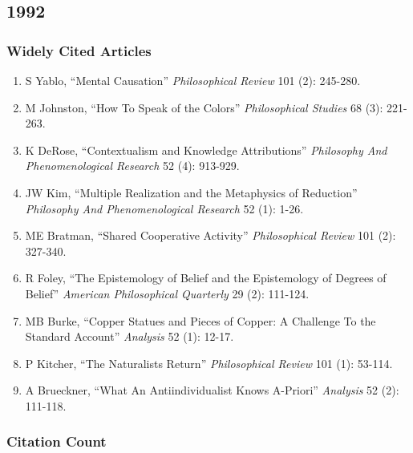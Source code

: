 \documentclass[
  10pt,
  letterpaper,
  DIV=11,
  numbers=noendperiod,
  twoside]{scrartcl}
\providecommand{\tightlist}{%
  \setlength{\itemsep}{0pt}\setlength{\parskip}{0pt}}\usepackage{longtable,booktabs,array}
\begin{document}
\newpage

\subsection{1992}\label{section-16}

\subsubsection*{Widely Cited Articles}\label{widely-cited-articles-16}

\begin{enumerate}
\def\labelenumi{\arabic{enumi}.}
\tightlist
\item
  S Yablo, ``Mental Causation'' \emph{Philosophical Review} 101 (2):
  245-280.
\item
  M Johnston, ``How To Speak of the Colors'' \emph{Philosophical
  Studies} 68 (3): 221-263.
\item
  K DeRose, ``Contextualism and Knowledge Attributions''
  \emph{Philosophy And Phenomenological Research} 52 (4): 913-929.
\item
  JW Kim, ``Multiple Realization and the Metaphysics of Reduction''
  \emph{Philosophy And Phenomenological Research} 52 (1): 1-26.
\item
  ME Bratman, ``Shared Cooperative Activity'' \emph{Philosophical
  Review} 101 (2): 327-340.
\item
  R Foley, ``The Epistemology of Belief and the Epistemology of Degrees
  of Belief'' \emph{American Philosophical Quarterly} 29 (2): 111-124.
\item
  MB Burke, ``Copper Statues and Pieces of Copper: A Challenge To the
  Standard Account'' \emph{Analysis} 52 (1): 12-17.
\item
  P Kitcher, ``The Naturalists Return'' \emph{Philosophical Review} 101
  (1): 53-114.
\item
  A Brueckner, ``What An Antiindividualist Knows A-Priori''
  \emph{Analysis} 52 (2): 111-118.
\end{enumerate}

\subsubsection*{Citation Count}\label{citation-count-16}
\end{document}
